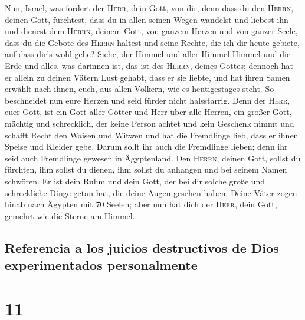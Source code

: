 Nun, Israel, was fordert der \textsc{Herr}, dein Gott,
von dir, denn dass du den \textsc{Herrn}, deinen Gott, fürchtest, dass
du in allen seinen Wegen wandelst und liebest ihn und dienest dem
\textsc{Herrn}, deinem Gott, von ganzem Herzen und von ganzer Seele,
 dass du die Gebote des \textsc{Herrn} haltest und seine
Rechte, die ich dir heute gebiete, auf dass dir's wohl gehe?
 Siehe, der Himmel und aller Himmel Himmel und die Erde
und alles, was darinnen ist, das ist des \textsc{Herrn}, deines Gottes;
 dennoch hat er allein zu deinen Vätern Lust gehabt, dass
er sie liebte, und hat ihren Samen erwählt nach ihnen, euch, aus allen
Völkern, wie es heutigestages steht.  So beschneidet nun
eure Herzen und seid fürder nicht halsstarrig.  Denn der
\textsc{Herr}, euer Gott, ist ein Gott aller Götter und Herr über alle
Herren, ein großer Gott, mächtig und schrecklich, der keine Person
achtet und kein Geschenk nimmt  und schafft Recht den
Waisen und Witwen und hat die Fremdlinge lieb, dass er ihnen Speise und
Kleider gebe.  Darum sollt ihr auch die Fremdlinge
lieben; denn ihr seid auch Fremdlinge gewesen in Ägyptenland.
 Den \textsc{Herrn}, deinen Gott, sollst du fürchten, ihm
sollst du dienen, ihm sollst du anhangen und bei seinem Namen schwören.
 Er ist dein Ruhm und dein Gott, der bei dir solche große
und schreckliche Dinge getan hat, die deine Augen gesehen haben.
 Deine Väter zogen hinab nach Ägypten mit 70 Seelen; aber
nun hat dich der \textsc{Herr}, dein Gott, gemehrt wie die Sterne am
Himmel.

\hypertarget{referencia-a-los-juicios-destructivos-de-dios-experimentados-personalmente}{%
\subsection{Referencia a los juicios destructivos de Dios experimentados
personalmente}\label{referencia-a-los-juicios-destructivos-de-dios-experimentados-personalmente}}

\hypertarget{section-10}{%
\section{11}\label{section-10}}

